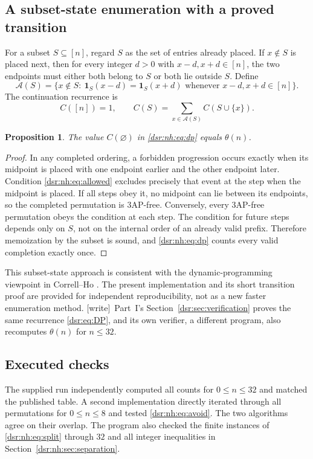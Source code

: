 \documentclass[11pt,a4paper]{article}
\numberwithin{equation}{section}
\newtheorem{proposition}[theorem]{Proposition}
\theoremstyle{definition}
\theoremstyle{remark}
\newcommand{\wtag}{\textup{[write]}}
\newcommand{\tht}{\theta}
\theoremstyle{definition}
\theoremstyle{plain}
\begin{document}
\subsection{A subset-state enumeration with a proved transition}
For a subset $S\subseteq[n]$, regard $S$ as the set of entries already placed.
If $x\notin S$ is placed next, then for every integer $d>0$ with
$x-d,x+d\in[n]$, the two endpoints must either both belong to $S$ or both
lie outside $S$. Define
\begin{equation}
\mathcal A(S)=\{x\notin S:\
\mathbf1_S(x-d)=\mathbf1_S(x+d)
\text{ whenever }x-d,x+d\in[n]\}.
\label{dsr:nh:eq:allowed}
\end{equation}
The continuation recurrence is
\begin{equation}
C([n])=1,\qquad
C(S)=\sum_{x\in\mathcal A(S)}C(S\cup\{x\}).
\label{dsr:nh:eq:dp}
\end{equation}

\begin{proposition}
\label{dsr:nh:prop:dp}
The value $C(\varnothing)$ in \eqref{dsr:nh:eq:dp} equals $\tht(n)$.
\end{proposition}
\begin{proof}
In any completed ordering, a forbidden progression occurs exactly when its
midpoint is placed with one endpoint earlier and the other endpoint later.
Condition \eqref{dsr:nh:eq:allowed} excludes precisely that event at the step when
the midpoint is placed. If all steps obey it, no midpoint can lie between
its endpoints, so the completed permutation is 3AP-free. Conversely,
every 3AP-free permutation obeys the condition at each step. The condition
for future steps depends only on $S$, not on the internal order of an
already valid prefix. Therefore memoization by the subset is sound, and
\eqref{dsr:nh:eq:dp} counts every valid completion exactly once.
\end{proof}
This subset-state approach is consistent with the dynamic-programming
viewpoint in Correll--Ho \cite{CorrellHo}. The present implementation and
its short transition proof are provided for independent reproducibility,
not as a new faster enumeration method.
\wtag\ Part~I's Section~\ref{dsr:sec:verification} proves the same
recurrence \eqref{dsr:eq:DP}, and its own verifier, a different program,
also recomputes $\tht(n)$ for $n\le32$.

\subsection{Executed checks}
The supplied run independently computed all counts for $0\le n\le32$
and matched the published table. A second implementation directly iterated
through all permutations for $0\le n\le8$ and tested
\eqref{dsr:nh:eq:avoid}. The two algorithms agree on their overlap. The program
also checked the finite instances of \eqref{dsr:nh:eq:split} through $32$ and
all integer inequalities in Section~\ref{dsr:nh:sec:separation}.
\end{document}
